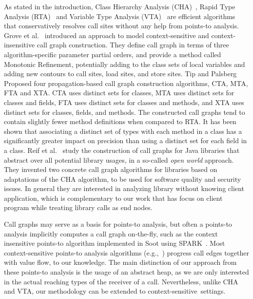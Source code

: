 \documentclass{fac}
\begin{document}
As stated in the introduction, Class Hierarchy Analysis (CHA)~\cite{Dean1995,Fernandez1995}, Rapid Type Analysis (RTA)~\cite{Bacon1996} and Variable Type Analysis (VTA)~\cite{Sundaresan2000} are efficient algorithms that conservatively resolves call sites without any help from points-to analysis. Grove et al.~\cite{Grove1997} introduced an approach to model context-sensitive and context-insensitive call graph construction. They define call graph in terms of three algorithm-specific parameter partial orders, and provide a method called Monotonic Refinement, potentially adding to the class sets of local variables and adding new contours to call sites, load sites, and store sites.
%
Tip and Palsberg~\cite{Tip2000} Proposed four propagation-based call graph construction algorithms, CTA, MTA, FTA and XTA. CTA uses distinct sets for classes, MTA uses distinct sets for classes and fields, FTA uses distinct sets for classes and methods, and XTA uses distinct
sets for classes, fields, and methods. The constructed call graphs tend to contain slightly fewer method definitions when compared to RTA. It has been shown that associating a distinct set of types with each method in a class has a significantly greater impact on precision than using a distinct set for each field in a class. Reif et al.~\cite{Reif2016} study the construction of call graphs for Java libraries that abstract over all potential library usages, in a so-called \emph{open world} approach. They invented two concrete call graph algorithms for libraries based on adaptations of the CHA algorithm, to be used for software quality and security issues. In general they are interested in analyzing library without knowing client application, which is complementary to our work that has focus on client program while treating library calls as end nodes.

Call graphs may serve as a basis for points-to analysis, but often a points-to analysis implicitly computes a call graph on-the-fly, such as the context insensitive points-to algorithm implemented in Soot using SPARK~\cite{Lhotak2003}. Most context-sensitive points-to analysis algorithms (e.g.,~\cite{Milanova2005,Sridharan2006,Smaragdakis11,Tan16}) progress call edges together with value flow, to our knowledge. The main distinction of our approach from these points-to analysis is the usage of an abstract heap, as we are only interested in the actual reaching types of the receiver of a call. Nevertheless, unlike CHA and VTA, our methodology can be extended to context-sensitive~settings.
\end{document}
